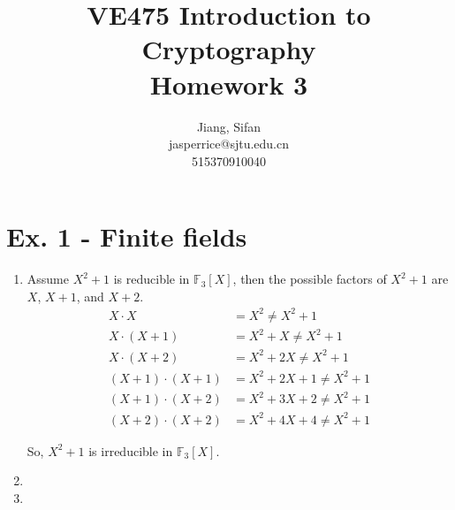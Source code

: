 \documentclass[11pt,a4paper]{article}
\title{
	VE475 Introduction to Cryptography \\
	Homework 3
}
\author{
	Jiang, Sifan\\
	jasperrice@sjtu.edu.cn\\
	515370910040
}
\begin{document}
\maketitle


\section*{Ex. 1 - Finite fields}
\begin{enumerate}
	\item Assume $X^{2} + 1$ is reducible in $\mathbb{F}_{3}[X]$, then the possible factors of $X^{2} + 1$ are $X$, $X + 1$, and $X + 2$.
		\begin{align*}
			X \cdot X &= X^{2} \neq X^{2} + 1 \\
			X \cdot (X + 1) &= X^{2} + X \neq X^{2} + 1 \\
			X \cdot (X + 2) &= X^{2} + 2X \neq X^{2} + 1 \\
			(X + 1) \cdot (X + 1) &= X^{2} + 2X + 1 \neq X^{2} + 1 \\
			(X + 1) \cdot (X + 2) &= X^{2} + 3X + 2 \neq X^{2} + 1 \\
			(X + 2) \cdot (X + 2) &= X^{2} + 4X + 4 \neq X^{2} + 1
		\end{align*}
	\par So, $X^{2} + 1$ is irreducible in $\mathbb{F}_{3}[X]$.

	\item 
	
	\item 
\end{enumerate}
\end{document}
